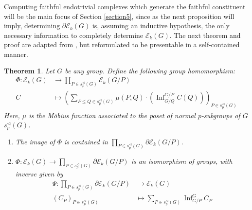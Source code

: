 \documentclass[10pt,letterpaper, boxed, cm]{amsart}
\newcommand{\Inf}{\operatorname{Inf}}
\newcommand{\calE}{\mathcal{E}}
\newtheorem{theorem}{Theorem}[section]
\theoremstyle{remark}
\theoremstyle{definition}
\begin{document}
	Computing faithful endotrivial complexes which generate the faithful constituent will be the main focus of Section \ref{section5}, since as the next proposition will imply, determining $\partial\calE_k(G)$ is, assuming an inductive hypothesis, the only necessary information to completely determine $\calE_k(G)$. The next theorem and proof are adapted from \cite[Proposition 6.3.3]{Bou10}, but reformulated to be presentable in a self-contained manner.


	\begin{theorem}{\cite[Proposition 6.3.3]{Bou10}}\label{faithfuldecomp}
		Let $G$ be any group. Define the following group homomorphism:
		\begin{align*}
		\Phi: \calE_k(G) &\to \prod_{P \in s_p^\triangleleft(G)}\calE_k(G/P)\\
		C &\mapsto  \left(\sum_{P\leq Q \in s_p^\triangleleft(G)}\mu(P,Q)\cdot \left(\Inf^{G/P}_{G/Q}C(Q)\right)\right)_{P \in s^\triangleleft_p(G)}
		\end{align*}
		Here, $\mu$ is the M\"obius function associated to the poset of normal $p$-subgroups of $G$ $s_p^\triangleleft (G)$.
		\begin{enumerate}
			\item The image of $\Phi$ is contained in $\prod_{P\in s_p^\triangleleft(G)}\partial\calE_k(G/P)$.
			\item $\Phi: \calE_k(G) \to \prod_{P \in s_p^\triangleleft(G)}\partial\calE_k(G/P)$ is an isomorphism of groups, with inverse given by
			\begin{align*}
			\Psi: \prod_{P\in s_p^\triangleleft(G)}\partial\calE_k(G/P) &\to \calE_k(G) \\
			(C_P)_{P\in s_p^\triangleleft(G)} & \mapsto \sum_{P\in s_p^\triangleleft(G)}\Inf^G_{G/P} C_P
			\end{align*}
		\end{enumerate}
	\end{theorem}
\end{document}
